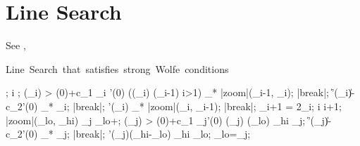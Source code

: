 \section{Line Search}\label{sec:LineSearch}
See \cite{Nocedal2006}, \cite{MoreThuente1992}

\begin{algorithm}
    \mbox{Line Search that satisfies strong Wolfe conditions}
    \begin{program}
        \BEGIN
        ;
        i ;
         \DO
        \IF \phi(\alpha_i) > \phi(0)+c_1 \alpha_i \phi'(0) \OR
            (\phi(\alpha_i) \ge \phi(\alpha_{i-1}) \AND i>1)
        \THEN
            \alpha_* \leftarrow |zoom|(\alpha_{i-1}, \alpha_i);
            |break|;
        \FI
        \IF \|\phi'(\alpha_i)\| \le -c_2\phi'(0)
        \THEN
            \alpha_* \leftarrow \alpha_i;
            |break|;
        \FI
        \IF \phi'(\alpha_i) 
        \THEN
            \alpha_* \leftarrow |zoom|(\alpha_i, \alpha_{i-1});
            |break|;
        \FI
        \alpha_{i+1} = 2\alpha_i;
        i \leftarrow i+1;
        \OD
        \WHERE
        \FUNCT |zoom|(\alpha_{lo}, \alpha_{hi}) \BODY
             \DO
                \EXP \alpha_j \leftarrow \alpha_{lo}+;
                \IF \phi(\alpha_j) > \phi(0)+c_1 \alpha_j\phi'(0) \OR %
                    \phi(\alpha_j) \ge \phi(\alpha_{lo})
                \THEN
                    \alpha_{hi} \leftarrow \alpha_j;
                \ELSE
                    \IF \|\phi'(\alpha_j)\| \le -c_2\phi'(0)
                    \THEN
                        \alpha_* \leftarrow \alpha_j;
                        |break|;
                    \FI
                    \IF \phi'(\alpha_j)(\alpha_{hi}-\alpha_{lo}) 
                    \THEN
                        \alpha_{hi} \leftarrow \alpha_{lo};
                    \FI
                    \alpha_{lo}=\alpha_j;
                \FI
            \OD
            \ENDEXP \ENDFUNCT
        \END
    \end{program}
\end{algorithm}

